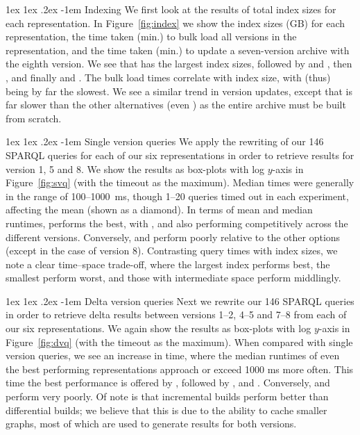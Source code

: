 \documentclass{llncs}
\makeatletter
\renewcommand\paragraph{\@startsection{paragraph}{4}{\z@}%
	{1ex \@plus1ex \@minus.2ex}%
	{-1em}%
	{\normalfont\normalsize\itshape}}
\makeatother
\begin{document}
\paragraph{Indexing} We first look at the results of total index sizes for each representation. In Figure~\ref{fig:index} we show the index sizes (GB) for each representation, the time taken (min.) to bulk load all versions in the representation, and the time taken (min.) to update a seven-version archive with the eighth version. We see that \ic has the largest index sizes, followed by \cbpd and \cbmd, then \tb, and finally \cbpi and \cbmi. The bulk load times correlate with index size, with \ic (thus) being by far the slowest. We see a similar trend in version updates, except that \cbmd is far slower than the other alternatives (even \ic) as the entire archive must be built from scratch.

\paragraph{Single version queries} We apply the rewriting of our 146 SPARQL queries for each of our six representations in order to retrieve results for version 1, 5 and 8. We show the results as box-plots with log $y$-axis in Figure~\ref{fig:svq} (with the timeout as the maximum). Median times were generally in the range of 100--1000~ms, though 1--20 queries timed out in each experiment, affecting the mean (shown as a diamond). In terms of mean and median runtimes, \ic performs the best, with \cbpd, \cbmd and \tb also performing competitively across the different versions. Conversely, \cbpi and \cbmi perform poorly relative to the other options (except \cbmi in the case of version 8). Contrasting query times with index sizes, we note a clear time--space trade-off, where the largest index performs best, the smallest perform worst, and those with intermediate space perform middlingly. 

\paragraph{Delta version queries} Next we rewrite our 146 SPARQL queries in order to retrieve delta results between versions 1--2, 4--5 and 7--8 from each of our six representations. We again show the results as box-plots with log $y$-axis in Figure~\ref{fig:dvq} (with the timeout as the maximum). When compared with single version queries, we see an increase in time, where the median runtimes of even the best performing representations approach or exceed 1000 ms more often. This time the best performance is offered by \tb, followed by \ic, \cbpi and \cbmi. Conversely,  \cbpd and \cbmd perform very poorly. Of note is that incremental builds perform better than differential builds; we believe that this is due to the ability to cache smaller graphs, most of which are used to generate results for both versions.
\end{document}
